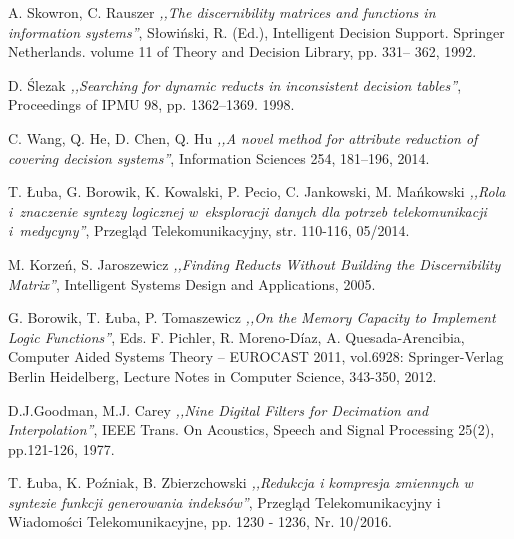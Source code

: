 \begin{thebibliography}{99}
 A. Skowron, C. Rauszer \emph{,,The discernibility matrices and functions in information systems''}, Słowiński, R. (Ed.), Intelligent Decision Support. Springer Netherlands. volume 11 of Theory and Decision Library, pp. 331– 362, 1992.

 D. Ślezak \emph{,,Searching for dynamic reducts in inconsistent decision tables''}, Proceedings of IPMU 98, pp. 1362–1369. 1998.

 C. Wang, Q. He, D. Chen, Q. Hu \emph{,,A novel method for attribute reduction of covering decision systems''}, Information Sciences 254, 181–196, 2014.

 T. Łuba, G. Borowik, K. Kowalski, P. Pecio, C. Jankowski, M. Mańkowski \emph{,,Rola i~znaczenie syntezy logicznej w~eksploracji danych dla potrzeb telekomunikacji i~medycyny''}, Przegląd Telekomunikacyjny, str. 110-116, 05/2014.

 M. Korzeń, S. Jaroszewicz \emph{,,Finding Reducts Without Building the Discernibility Matrix''}, Intelligent Systems Design and Applications, 2005.

 G. Borowik, T. Łuba, P. Tomaszewicz \emph{,,On the Memory Capacity to Implement Logic Functions''}, Eds. F. Pichler, R. Moreno-Díaz, A. Quesada-Arencibia, Computer Aided Systems Theory – EUROCAST 2011, vol.6928: Springer-Verlag Berlin Heidelberg, Lecture Notes in Computer Science, 343-350, 2012.

 D.J.Goodman, M.J. Carey \emph{,,Nine Digital Filters for Decimation and Interpolation''}, IEEE Trans. On Acoustics, Speech and Signal Processing 25(2), pp.121-126, 1977.

 T. Łuba, K. Poźniak, B. Zbierzchowski \emph{,,Redukcja i kompresja zmiennych w syntezie funkcji generowania indeksów''}, Przegląd Telekomunikacyjny i Wiadomości Telekomunikacyjne, pp. 1230 - 1236, Nr. 10/2016.

\end{thebibliography}
\clearpage




